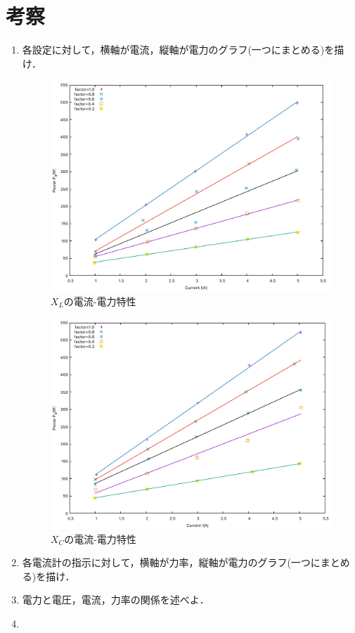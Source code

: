 \clearpage
\section{考察}
\begin{enumerate}[1.)]
	\item 各設定に対して，横軸が電流，縦軸が電力のグラフ(一つにまとめる)を描け．
	\begin{figure}[h]
	\centering
	\includegraphics[scale=0.6]{./data/L/L.pdf}
	\caption{$X_L$の電流-電力特性}
	\label{fig:L}
	\end{figure}
	\begin{figure}[h]
	\centering
	\includegraphics[scale=0.6]{./data/C/C.pdf}
	\caption{$X_C$の電流-電力特性}
	\label{fig:C}
	\end{figure}
	\item 各電流計の指示に対して，横軸が力率，縦軸が電力のグラフ(一つにまとめる)を描け．
	\item 電力と電圧，電流，力率の関係を述べよ．
	\item 
\end{enumerate}